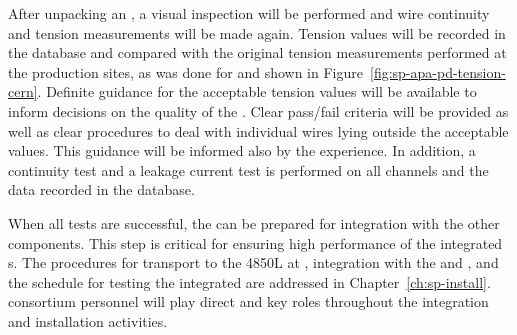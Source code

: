 After unpacking an ,  a visual inspection will be performed and wire continuity and tension measurements will be made again. 
Tension values will be recorded in the database and compared with the original tension measurements performed at the production sites, as was done for  and shown in Figure~\ref{fig:sp-apa-pd-tension-cern}. Definite guidance for the acceptable tension values will be available to inform decisions on the quality of the . Clear pass/fail criteria %
will be provided as well as clear procedures to deal with individual wires lying outside the acceptable values. %
This guidance will be informed also by the  experience. %
In addition, a continuity test and a leakage current test is performed on all channels and the data recorded in the database. 


When all tests are successful, 
the  can be prepared 
for integration with the other components. %
This step is critical for ensuring high performance of the integrated s. The procedures for  transport to the 4850L at , integration with the  and , and the schedule for testing the integrated  are addressed in %
Chapter~\ref{ch:sp-install}.  consortium personnel will play direct and key roles throughout the integration and installation activities.  



